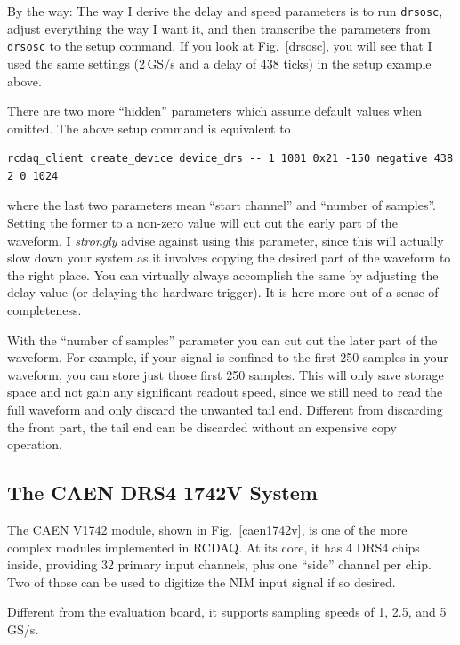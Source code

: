 \documentclass{article}[11pt]
\begin{document}
By the way: The way I derive the delay and speed parameters is to run
\verb|drsosc|, adjust everything the way I want it, and then
transcribe the parameters from \verb|drsosc| to the setup command. If
you look at Fig.~\ref{drsosc}, you will see that I used the same
settings (2\,GS/s and a delay of 438 ticks) in the setup example
above.

There are two more ``hidden'' parameters which assume default values
when omitted.  The above setup command is equivalent to

\begin{verbatim}
rcdaq_client create_device device_drs -- 1 1001 0x21 -150 negative 438 2 0 1024
\end{verbatim}

where the last two parameters mean ``start channel'' and ``number of
samples''. Setting the former to a non-zero value will cut out the
early part of the waveform. I \emph{strongly} advise against using
this parameter, since this will actually slow down your system as it
involves copying the desired part of the waveform to the right place.
You can virtually always accomplish the same by adjusting the delay
value (or delaying the hardware trigger). It is here more
out of a sense of completeness.

With the ``number of samples'' parameter you can cut out the later
part of the waveform. For example, if your signal is confined to the
first 250 samples in your waveform, you can store just those first 250
samples. This will only save storage space and not gain any
significant readout speed, since we still need to read the full
waveform and only discard the unwanted tail end. Different from
discarding the front part, the tail end can be discarded without an
expensive copy operation.


\subsection{The CAEN DRS4 1742V System}


The CAEN V1742 module, shown in Fig.~\ref{caen1742v}, is one of the
more complex modules implemented in RCDAQ. At its core, it has 4 DRS4
chips inside, providing 32 primary input channels, plus one ``side''
channel per chip. Two of those can be used to digitize the NIM input
signal if so desired.

Different from the evaluation board, it supports sampling speeds of 1,
2.5, and 5\,GS/s.
\end{document}
